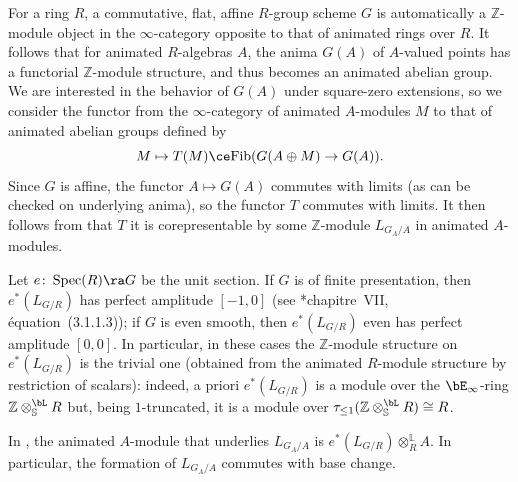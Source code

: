  \label{def-setup}
For a ring $R$, a commutative, flat, affine $R$-group scheme $G$ is automatically a $\mathbb Z$-module object in the $\infty$-category opposite to that of animated rings over $R$. %
It follows that for animated $R$-algebras $A$, the anima $G(A)$ of $A$-valued points has a functorial $\mathbb Z$-module structure, and thus becomes an animated abelian group. We are interested in the behavior of $G(A)$ under square-zero extensions, so we  consider the functor from the $\infty$-category of animated $A$-modules $M$ to that of animated abelian groups defined by
\[
M\mapsto T(M) \ce \mathrm{Fib}(G(A\oplus M)\to G(A)).
\]
Since $G$ is affine, the functor $A\mapsto G(A)$ commutes with %
 limits (as can be checked on underlying anima), so the functor $T$ commutes with %
 limits. %
 It %
 then  follows from \cite[Proposition 5.5.2.7]{HTT} that $T$ it is corepresentable by some $\mathbb Z$-module $L_{G_A/A}$ in animated $A$-modules.

Let $e \colon \Spec(R)\ra G$ be the unit section. If $G$ is of finite presentation, then $e^*(L_{G/R})$ has perfect amplitude $[-1, 0]$ (see \cite{Ill72}*{chapitre~VII, \'{e}quation~(3.1.1.3)}); if $G$ is even smooth, then $e^*(L_{G/R})$ even has perfect amplitude $[0, 0]$. In particular, in these cases the $\mathbb Z$-module structure on $e^*(L_{G/R})$ is the trivial one (obtained from the animated $R$-module structure by restriction of scalars): indeed, a priori $e^*(L_{G/R})$ is a module over the $\bE_\infty$-ring $\mathbb Z\otimes_{\mathbb S}^\bL R$ but, being $1$-truncated, it is a module over $\tau_{\leq 1}(\mathbb Z\otimes_{\mathbb S}^\bL R)\cong R$.
\epp

\begin{proposition}
\notready \label{L-underlie}
In \uS{}, the animated $A$-module that underlies $L_{G_A/A}$ is $e^\ast(  L_{G/R})\otimes_R^{\mathbb L} A$. In particular, the formation of $L_{G_A/A}$ commutes with base change. %
\end{proposition}

